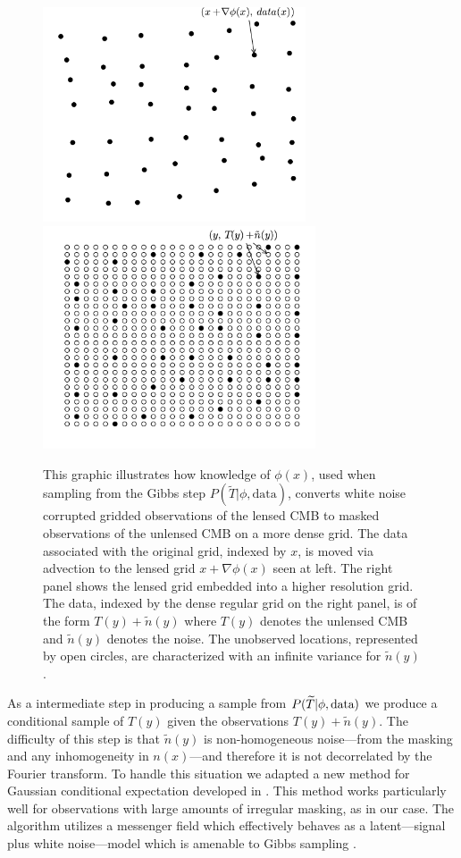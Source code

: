 \documentclass[iop,revtex4,apj,onecolumn]{emulateapj}
\begin{document}
\begin{figure}
\begin{center}
{\includegraphics[height=2.5in]{figure3a.pdf}}%
{\includegraphics[height=2.6in]{figure3b.pdf}}
\end{center}
 \caption{
\label{embed}
 This graphic illustrates how knowledge of $\phi(x)$, used when sampling from the Gibbs step $P(\widetilde T|\phi,\text{data})$, converts white noise corrupted gridded observations of the lensed CMB to masked observations of the unlensed CMB on a more dense grid.  The data associated with the original grid, indexed by $x$, is moved via advection to the lensed grid $x+\nabla \phi(x)$ seen at left. The right panel shows the lensed grid embedded into a higher resolution grid. The data, indexed by the dense regular grid on the right panel, is of the form $T(y)+\tilde n(y)$ where $T(y)$ denotes the unlensed CMB and $\tilde n(y)$ denotes the noise. The unobserved locations, represented by open circles, are characterized with an infinite variance for  $\tilde n(y)$. 
} 
\end{figure}


As a intermediate step in producing a sample from  $P(\widetilde T |  \phi,\text{\rm data})$ we produce a conditional  sample of $T(y)$ given the observations $T(y) + \tilde n(y)$. The difficulty of this step is that $\tilde n(y)$ is non-homogeneous noise---from the masking and any inhomogeneity in $n(x)$---and therefore it is not decorrelated by the Fourier transform. To handle this situation we adapted a new method for Gaussian conditional expectation developed in \cite{elsner2013efficient}. This method works particularly well for observations with large amounts of irregular masking, as in our case. The algorithm utilizes a messenger field which effectively behaves as a latent---signal plus white noise---model which is amenable to Gibbs sampling \citep{jasche2014matrix}.
\end{document}
